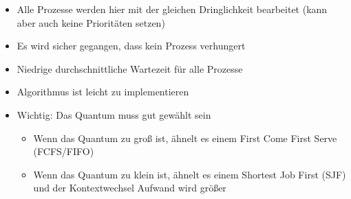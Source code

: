 \documentclass{article}
\begin{document}
\begin{itemize}
    \item Alle Prozesse werden hier mit der gleichen Dringlichkeit bearbeitet (kann aber auch keine Prioritäten setzen)
    \item Es wird sicher gegangen, dass kein Prozess verhungert
    \item Niedrige durchschnittliche Wartezeit für alle Prozesse
    \item Algorithmus ist leicht zu implementieren
    \item Wichtig: Das Quantum muss gut gewählt sein
          \begin{itemize}
              \item Wenn das Quantum zu groß ist, ähnelt es einem First Come First Serve (FCFS/FIFO)
              \item Wenn das Quantum zu klein ist, ähnelt es einem Shortest Job First (SJF) und der Kontextwechsel Aufwand wird größer
          \end{itemize}
\end{itemize}

\nocite{*}
\printbibliography
\end{document}
